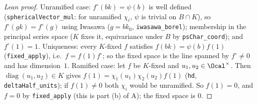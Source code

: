 \begin{proof}[Lean proof]
Unramified case: $f^\circ(bk)=\psi(b)$ is well defined (\texttt{sphericalVector\_mul}: for unramified $\chi_i$, $\psi$ is trivial on $B\cap K$), so $f^\circ(gk)=f^\circ(g)$ using Iwasawa ($g=bk_0$, \texttt{iwasawa\_borel}); membership in the principal series space ($K$ fixes it, equivariance under $B$ by \texttt{psChar\_coord}); and $f^\circ(1)=1$. Uniqueness: every $K$-fixed $f$ satisfies $f(bk)=\psi(b)f(1)$ (\texttt{fixed\_apply}), i.e.\ $f=f(1)f^\circ$; so the fixed space is the line spanned by $f^\circ\ne0$ and has dimension~$1$. Ramified case: let $f$ be $K$-fixed and $u_1,u_2\in\Ocal^\times$. Then $\operatorname{diag}(u_1,u_2)\in K$ gives $f(1)=\chi_1(u_1)\chi_2(u_2)f(1)$ (\texttt{hd}, \texttt{deltaHalf\_units}); if $f(1)\ne0$ both $\chi_i$ would be unramified. So $f(1)=0$, and $f=0$ by \texttt{fixed\_apply} (this is part (b) of A); the fixed space is $0$.
\end{proof}

